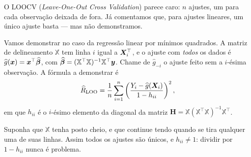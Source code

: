 O LOOCV (\emph{Leave-One-Out Cross Validation}) parece caro: $n$ ajustes, um para cada observação deixada de fora.
Já comentamos que, para ajustes lineares, um único ajuste basta --- mas não demonstramos.

Vamos demonstrar no caso da regressão linear por mínimos quadrados. A matriz de
delineamento $\mathbb{X}$ tem linha $i$ igual a $\bm{X}_i^\top$, e o ajuste com
\emph{todos} os dados é $\widehat g(\bm{x})=\bm{x}^\top\widehat{\bm{\beta}}$, com
$\widehat{\bm{\beta}}=(\mathbb{X}^\top\mathbb{X})^{-1}\mathbb{X}^\top\bm y$. Chame de
$\widehat g_{-i}$ o ajuste feito sem a $i$-ésima observação. A fórmula a demonstrar
é
\[
  \widehat{R}_{\text{LOO}}
   = \frac1n\sum_{i=1}^{n}\left(\frac{Y_i-\widehat g(\bm{X}_i)}{1-h_{ii}}\right)^{2},
\]
em que $h_{ii}$ é o $i$-ésimo elemento da diagonal da matriz
$\bm H=\mathbb{X}(\mathbb{X}^\top\mathbb{X})^{-1}\mathbb{X}^\top$.

Suponha que $\mathbb{X}$ tenha posto cheio, e que continue tendo quando se tira
qualquer uma de suas linhas. Assim todos os ajustes são únicos, e $h_{ii}\neq 1$:
dividir por $1-h_{ii}$ nunca é problema.


